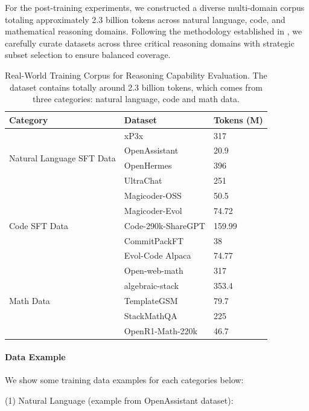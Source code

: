 \documentclass{article} %
\begin{document}
For the post-training experiments, we constructed a diverse multi-domain corpus totaling approximately 2.3 billion tokens across natural language, code, and mathematical reasoning domains. Following the methodology established in \citet{shen2024jetmoe}, we carefully curate datasets across three critical reasoning domains with strategic subset selection to ensure balanced coverage.

\begin{table}[h]
\centering
\caption{Real-World Training Corpus for Reasoning Capability Evaluation. The dataset contains totally around 2.3 billion tokens, which comes from three categories: natural language, code and math data.}
\label{tab:reasoning_training_data}
\begin{tabular}{lll}
\toprule
Category & Dataset & Tokens (M) \\
\midrule
\multirow{4}{*}{Natural Language SFT Data} & xP3x & 317 \\
& OpenAssistant & 20.9 \\
& OpenHermes & 396 \\
& UltraChat & 251 \\
\midrule
\multirow{5}{*}{Code SFT Data} & Magicoder-OSS & 50.5 \\
& Magicoder-Evol & 74.72 \\
& Code-290k-ShareGPT & 159.99 \\
& CommitPackFT & 38 \\
& Evol-Code Alpaca & 74.77 \\
\midrule
\multirow{5}{*}{Math Data} & Open-web-math & 317 \\
& algebraic-stack & 353.4 \\
& TemplateGSM & 79.7 \\
& StackMathQA & 225 \\
& OpenR1-Math-220k & 46.7 \\
\bottomrule
\end{tabular}
\end{table}


\paragraph{Data Example} We show some training data examples for each categories below:

(1) Natural Language (example from OpenAssistant dataset):
\end{document}
